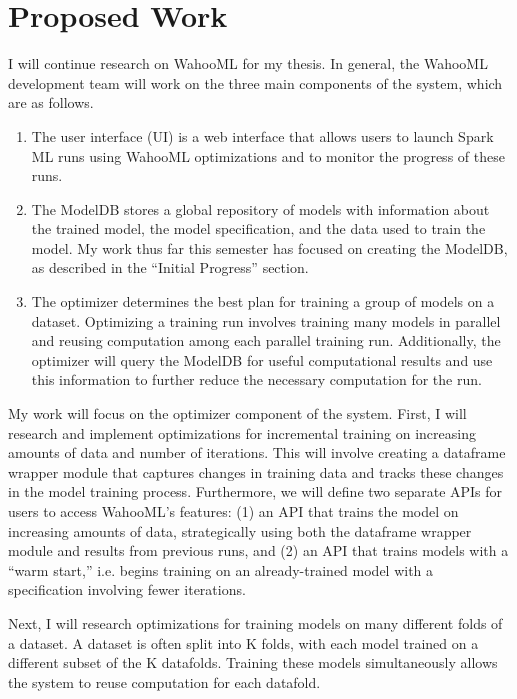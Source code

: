 \documentclass[../proposal.tex]{subfiles}
\begin{document}
\section{Proposed Work}

I will continue research on WahooML for my thesis. In general, the WahooML
development team will work on the three main components of the system, which
are as follows.

\begin{enumerate}[topsep=0pt,itemsep=-1ex,partopsep=1ex,parsep=1ex]

\item The user interface (UI) is a web interface that allows users to launch
Spark ML runs using WahooML optimizations and to monitor the progress of these
runs. 

\item The ModelDB stores a global repository of models with information about
the trained model, the model specification, and the data used to train the
model. My work thus far this semester has focused on creating the ModelDB, as
described in the ``Initial Progress'' section. 

\item The optimizer determines the best plan for training a group of models on
a dataset. Optimizing a training run involves training many models in parallel
and reusing computation among each parallel training run.  Additionally, the
optimizer will query the ModelDB for useful computational results and use this
information to further reduce the necessary computation for the run. 

\end{enumerate}

My work will focus on the optimizer component of the system. First, I will
research and implement optimizations for incremental training on increasing
amounts of data and number of iterations. This will involve creating a
dataframe wrapper module that captures changes in training data and tracks
these changes in the model training process. Furthermore, we will define two
separate APIs for users to access WahooML's features: (1) an API that trains
the model on increasing amounts of data, strategically using both the dataframe
wrapper module and results from previous runs, and (2) an API that trains
models with a ``warm start,'' i.e. begins training on an already-trained model
with a specification involving fewer iterations. 

Next, I will research optimizations for training models on many different folds
of a dataset. A dataset is often split into K folds, with each model trained on
a different subset of the K datafolds. Training these models simultaneously
allows the system to reuse computation for each datafold.
\end{document}
